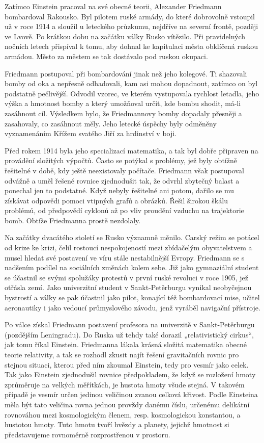   Zatímco Einstein pracoval na své obecné teorii, Alexander Friedmann bombardoval Rakousko. Byl
  pilotem ruské armády, do které dobrovolně vstoupil už v roce 1914 a sloužil u leteckého průzkumu,
  nejdříve na severní frontě, později ve Lvově. Po krátkou dobu na začátku války Rusko vítězilo. Při
  pravidelných nočních letech přispíval k tomu, aby dohnal ke kapitulaci města obklíčená ruskou
  armádou. Město za městem se tak dostávalo pod ruskou okupaci. 
  
  Friedmann postupoval při bombardování jinak než jeho kolegové. Ti shazovali bomby od oka a
  nepřesně odhadovali, kam asi mohou dopadnout, zatímco on byl podstatně pečlivější. Odvodil vzorec,
  ve kterém vystupovala rychlost letadla, jeho výška a hmotnost bomby a který umožňoval určit, kde
  bombu shodit, má-li zasáhnout cíl. Výsledkem bylo, že Friedmannovy bomby dopadaly přesněji a
  zasahovaly, co zasáhnout měly. Jeho letecké úspěchy byly odměněny vyznamenáním Křížem svatého Jiří
  za hrdinství v boji. 
  
  Před rokem 1914 byla jeho specializací matematika, a tak byl dobře připraven na provádění
  složitých výpočtů. Často se potýkal s problémy, jež byly obtížně řešitelné v době, kdy ještě
  neexistovaly počítače. Friedmann však postupoval odvážně a uměl řešené rovnice zjednodušit tak, že
  odvrhl zbytečný balast a ponechal jen to podstatné. Když nebyly řešitelné ani potom, dařilo se mu
  získávat odpovědi pomoci vtipných grafů a obrázků. Řešil širokou škálu problémů, od předpovědí
  cyklonů až po vliv proudění vzduchu na trajektorie bomb. Obtíže Friedmanna prostě nezdolaly. 
  
  Na začátky dvacátého století se Rusko významně měnilo. Carský režim se potácel od krize ke krizi,
  čelil rostoucí nespokojeností mezi zbídačelým obyvatelstvem a musel hledat své postavení ve víru
  stále nestabilnější Evropy. Friedmann se s nadšením podílel na sociálních změnách kolem sebe. Již
  jako gymnaziální student se účastnil se svými spolužáky protestů v první ruské revoluci v roce
  1905, jež otřásla zemí. Jako univerzitní student v Sankt-Petěrburgu vynikal neobyčejnou bystrostí
  a války se pak účastnil jako pilot, konající též bombardovací mise, učitel aeronautiky i jako
  vedoucí průmyslového závodu, jenž vyráběl navigační přístroje. 
  
  Po válce získal Friedmann postavení profesora na univerzitě v Sankt-Petěrburgu (pozdějším
  Leningradu). Do Ruska už tehdy také dorazil „relativistický cirkus“, jak tomu říkal Einstein.
  Friedmanna lákala krásná složitá matematika obecné teorie relativity, a tak se rozhodl zkusit
  najít řešení gravitačních rovnic pro stejnou situaci, kterou před ním zkoumal Einstein, tedy pro
  vesmír jako celek. Tak jako Einstein zjednodušil rovnice předpokladem, že když se rozložení hmoty
  zprůměruje na velkých měřítkách, je hustota hmoty všude stejná. V takovém případě je vesmír určen
  jedinou veličinou zvanou celková křivost. Podle Einsteina měla být tato veličina rovna jednou
  provždy danému číslu, určenému delikátní rovnováhou mezi kosmologickým členem, resp. kosmologickou
  konstantou, a hustotou hmoty. Tuto hmotu tvoří hvězdy a planety, jejichž hmotnost si představujeme
  rovnoměrně rozprostřenou v prostoru. 
  
